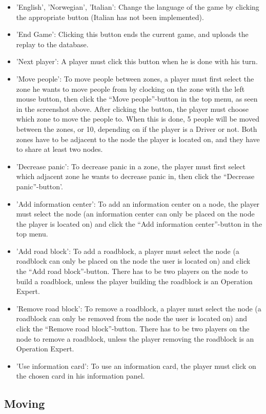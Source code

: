 \begin{itemize}
\item 'English', 'Norwegian', 'Italian': Change the language of the game by clicking the appropriate button (Italian has not been implemented).
\item 'End Game': Clicking this button ends the current game, and uploads the replay to the database.
\item 'Next player': A player must click this button when he is done with his turn.
\item 'Move people': To move people between zones, a player must first select the zone he wants to move people from by clocking on the zone with the left mouse button, then click the “Move people”-button in the top menu, as seen in the screenshot above. After clicking the button, the player must choose which zone to move the people to. When this is done, 5 people will be moved between the zones, or 10, depending on if the player is a Driver or not. Both zones have to be adjacent to the node the player is located on, and they have to share at least two nodes.
\item 'Decrease panic': To decrease panic in a zone, the player must first select which adjacent zone he wants to decrease panic in, then click the “Decrease panic”-button'.
\item 'Add information center': To add an information center on a node, the player must select the node (an information center can only be placed on the node the player is located on) and click the “Add information center”-button in the top menu.
\item 'Add road block': To add a roadblock, a player must select the node (a roadblock can only be placed on the node the user is located on) and click the “Add road block”-button. There has to be two players on the node to build a roadblock, unless the player building the roadblock is an Operation Expert.
\item 'Remove road block': To remove a roadblock, a player must select the node (a roadblock can only be removed from the node the user is located on) and click the “Remove road block”-button. There has to be two players on the node to remove a roadblock, unless the player removing the roadblock is an Operation Expert.
\item 'Use information card': To use an information card, the player must click on the chosen card in his information panel.
\end{itemize}

\subsection*{Moving}

